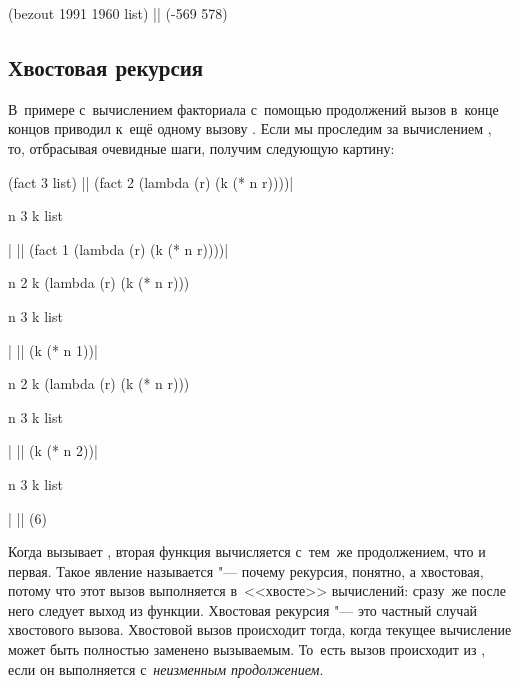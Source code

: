 \begin{code:lisp}
(bezout 1991 1960 list) |\is| (-569 578)
\end{code:lisp}


\subsection{Хвостовая рекурсия}\label{escape/pr-cont/ssect:tail-recusion}

В~примере с~вычислением факториала с~помощью продолжений вызов  в~конце
концов приводил к~ещё одному вызову . Если мы проследим за вычислением
, то, отбрасывая очевидные шаги, получим следующую картину:

\begin{code:lisp}
(fact 3 list)
|\eq| (fact 2 (lambda (r) (k (* n r))))|\begin{where}
                                        \- n {\is} 3
                                        \- k {\eq} list
                                        \end{where}|
|\eq| (fact 1 (lambda (r) (k (* n r))))|\begin{where}
                                \- n {\is} 2
                                \- k {\is} (lambda (r) (k (* n r)))\begin{where}
                                                                  \- n {\is} 3
                                                                  \- k {\eq} list
                                                                  \end{where}
                                        \end{where}|
|\eq| (k (* n 1))|\begin{where}
                  \- n {\is} 2
                  \- k {\is} (lambda (r) (k (* n r)))\begin{where}
                                                    \- n {\is} 3
                                                    \- k {\eq} list
                                                    \end{where}
                  \end{where}|
|\eq| (k (* n 2))|\begin{where}
                  \- n {\is} 3
                  \- k {\eq} list
                  \end{where}|
|\is| (6)
\end{code:lisp}

Когда  вызывает , вторая функция вычисляется с~тем~же
продолжением, что и первая. Такое явление называется 
"--- почему рекурсия, понятно, а хвостовая, потому что этот вызов выполняется
в~<<хвосте>> вычислений: сразу~же после него следует выход из функции. Хвостовая
рекурсия "--- это частный случай хвостового вызова. Хвостовой вызов происходит
тогда, когда текущее вычисление может быть полностью заменено вызываемым.
То~есть вызов происходит из , если он выполняется
с~\emph{неизменным продолжением}.

